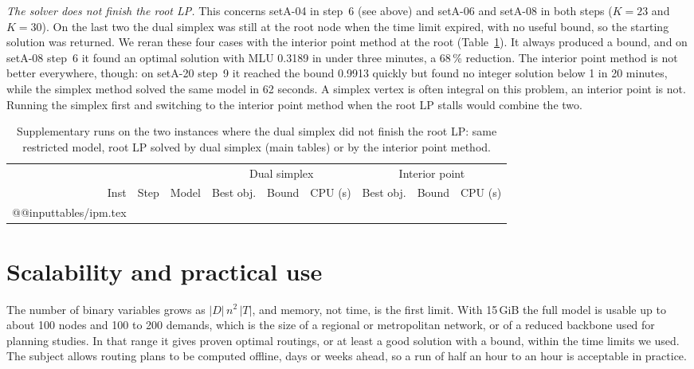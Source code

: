 \documentclass[11pt,a4paper]{article}
\begin{document}
\emph{The solver does not finish the root LP.} This concerns setA-04 in step~6 (see above) and
setA-06 and setA-08 in both steps ($K=23$ and $K=30$). On the last two the dual simplex was still at the root node when the time limit expired, with no useful
bound, so the starting solution was returned. We reran these four cases with the interior point
method at the root (Table~\ref{tab:ipm}). It always produced a bound, and on setA-08 step~6 it found
an optimal solution with MLU 0.3189 in under three minutes, a 68\,\% reduction. The interior point
method is not better everywhere, though: on setA-20 step~9 it reached the bound 0.9913 quickly but
found no integer solution below 1 in 20 minutes, while the simplex method solved the same model in
62 seconds. A simplex vertex is often integral on this problem, an interior point is not. Running
the simplex first and switching to the interior point method when the root LP stalls would combine
the two.

\begin{table}[tbp]
\centering\small
\caption{Supplementary runs on the two instances where the dual simplex did not finish the root LP:
same restricted model, root LP solved by dual simplex (main tables) or by the interior point method.}
\label{tab:ipm}
\begin{tabular}{@{}rrlccrccr@{}}
\toprule
 & & & \multicolumn{3}{c}{Dual simplex} & \multicolumn{3}{c}{Interior point}\\
\cmidrule(lr){4-6}\cmidrule(lr){7-9}
Inst & Step & Model & Best obj. & Bound & CPU (s) & Best obj. & Bound & CPU (s)\\
\midrule
\csname @@input\endcsname tables/ipm.tex 
\bottomrule
\end{tabular}
\end{table}

\section{Scalability and practical use}

The number of binary variables grows as $|D|\,n^2\,|T|$, and memory, not time, is the first limit.
With 15\,GiB the full model is usable up to about 100 nodes and 100 to 200 demands, which is the
size of a regional or metropolitan network, or of a reduced backbone used for planning studies. In
that range it gives proven optimal routings, or at least a good solution with a bound, within the
time limits we used. The subject allows routing plans to be computed offline, days or weeks ahead,
so a run of half an hour to an hour is acceptable in practice.
\end{document}
